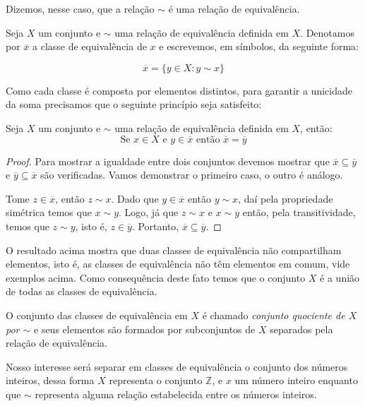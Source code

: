 	
	Dizemos, nesse caso, que a rela\c{c}\~ao $\sim$ \'e uma rela\c{c}\~{a}o de equival\^encia. 
		
	Seja $X$ um conjunto e $\sim$ uma rela\c{c}\~{a}o de equival\^{e}ncia definida em $X$. Denotamos por $\overline{x}$ 
	a classe de equival\^{e}ncia de $x$ e escrevemos, em s\'{i}mbolos, da seguinte forma:
	
	                     $$\overline{x}=\{y\in X: y\sim x\}$$
	
	Como cada classe \'{e} composta por elementos distintos, para garantir a unicidade da soma precisamos que o 
	seguinte princ\'{i}pio seja satisfeito:
	
	\begin{Th}
		Seja $X$ um conjunto e $\sim$ uma rela\c{c}\~{a}o de equival\^{e}ncia definida em $X$, ent\~{a}o:
		$$\textrm{Se } x\in X \textrm{ e } y\in\overline{x} \textrm{ ent\~{a}o } \overline{x}=\overline{y}$$
	\end{Th}
	
	\begin{proof}
		Para mostrar a igualdade entre dois conjuntos devemos mostrar que $\overline{x}\subseteq\overline{y}$
		e $\overline{y}\subseteq\overline{x}$ s\~ao verificadas. Vamos demonstrar o primeiro caso, o outro \'{e} an\'{a}logo.
			
		Tome $z\in\overline{x}$, ent\~{a}o $z\sim x$. Dado que $y\in\overline{x}$
			ent\~{a}o $y\sim x$, da\'{i} pela propriedade sim\'{e}trica temos que $x\sim y$. Logo, j\'{a} que 
			$z\sim x$ e $x\sim y$ ent\~{a}o, pela transitividade, temos que $z\sim y$, isto \'{e}, $z\in\overline{y}$.
			Portanto, $\overline{x}\subseteq\overline{y}$. 
	\end{proof}
	
	O resultado acima mostra que duas classes de equival\^{e}ncia n\~{a}o compartilham elementos, isto \'{e}, as classes de equival\^{e}ncia
	n\~{a}o t\^{e}m elementos em comum, vide exemplos acima. Como consequ\^{e}ncia deste fato temos que o conjunto $X$ \'{e} a 
	uni\~{a}o de todas as classes de equival\^{e}ncia. 
	
	O conjunto das classes de equival\^{e}ncia em $X$ \'{e} chamado \textit{conjunto quociente de $X$ por $\sim$} e 
	seus elementos s\~{a}o formados por subconjuntos de $X$ separados pela rela\c{c}\~{a}o de equival\^{e}ncia.
	
	Nosso interesse ser\'{a} separar em classes de equival\^{e}ncia o conjunto dos n\'{u}meros inteiros, dessa forma $X$ representa
	o conjunto $\mathbb{Z}$, e $x$ um n\'{u}mero inteiro enquanto que
	$\sim$ representa alguma rela\c{c}\~{a}o estabelecida entre os n\'{u}meros inteiros. 
	
